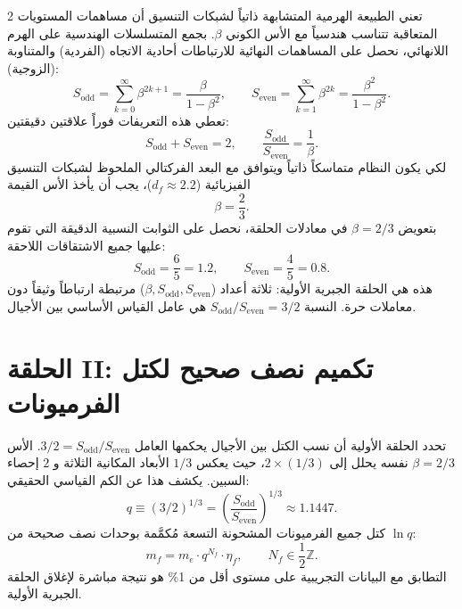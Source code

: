 \documentclass[12pt,a4paper]{article}
\begin{document}
\begin{multicols}{2}
		تعني الطبيعة الهرمية المتشابهة ذاتياً لشبكات التنسيق أن مساهمات المستويات المتعاقبة تتناسب هندسياً مع الأس الكوني \(\beta\). بجمع المتسلسلات الهندسية على الهرم اللانهائي، نحصل على المساهمات النهائية للارتباطات أحادية الاتجاه (الفردية) والمتناوبة (الزوجية):
		\begin{equation}
			S_{\mathrm{odd}} = \sum_{k=0}^{\infty} \beta^{2k+1} = \frac{\beta}{1-\beta^{2}}, \qquad
			S_{\mathrm{even}} = \sum_{k=1}^{\infty} \beta^{2k} = \frac{\beta^{2}}{1-\beta^{2}}.
		\end{equation}
		تعطي هذه التعريفات فوراً علاقتين دقيقتين:
		\begin{equation}
			S_{\mathrm{odd}} + S_{\mathrm{even}} = 2, \qquad \frac{S_{\mathrm{odd}}}{S_{\mathrm{even}}} = \frac{1}{\beta}.
		\end{equation}
		لكي يكون النظام متماسكاً ذاتياً ويتوافق مع البعد الفركتالي الملحوظ لشبكات التنسيق الفيزيائية (\(d_f \approx 2.2\))، يجب أن يأخذ الأس القيمة
		\begin{equation}
			\boxed{\beta = \frac{2}{3}}.
		\end{equation}
		بتعويض \(\beta = 2/3\) في معادلات الحلقة، نحصل على الثوابت النسبية الدقيقة التي تقوم عليها جميع الاشتقاقات اللاحقة:
		\begin{equation}
			\boxed{S_{\mathrm{odd}} = \frac{6}{5} = 1.2, \qquad S_{\mathrm{even}} = \frac{4}{5} = 0.8.}
		\end{equation}
		هذه هي الحلقة الجبرية الأولية: ثلاثة أعداد (\(\beta, S_{\mathrm{odd}}, S_{\mathrm{even}}\)) مرتبطة ارتباطاً وثيقاً دون معاملات حرة. النسبة \(S_{\mathrm{odd}}/S_{\mathrm{even}} = 3/2\) هي عامل القياس الأساسي بين الأجيال.
		
		\section{الحلقة II: تكميم نصف صحيح لكتل الفرميونات}
		
		تحدد الحلقة الأولية أن نسب الكتل بين الأجيال يحكمها العامل \(3/2 = S_{\mathrm{odd}}/S_{\mathrm{even}}\). الأس \(\beta = 2/3\) نفسه يحلل إلى \(2 \times (1/3)\)، حيث يعكس \(1/3\) الأبعاد المكانية الثلاثة و \(2\) إحصاء السبين. يكشف هذا عن الكم القياسي الحقيقي:
		\begin{equation}
			q \equiv (3/2)^{1/3} = \left( \frac{S_{\mathrm{odd}}}{S_{\mathrm{even}}} \right)^{1/3} \approx 1.1447.
		\end{equation}
		كتل جميع الفرميونات المشحونة التسعة مُكمَّمة بوحدات نصف صحيحة من \(\ln q\):
		\begin{equation}
			m_f = m_e \cdot q^{N_f} \cdot \eta_f, \qquad N_f \in \frac{1}{2}\mathbb{Z}.
		\end{equation}
		التطابق مع البيانات التجريبية على مستوى أقل من 1\% هو نتيجة مباشرة لإغلاق الحلقة الجبرية الأولية.
		

\end{multicols}
\end{document}
